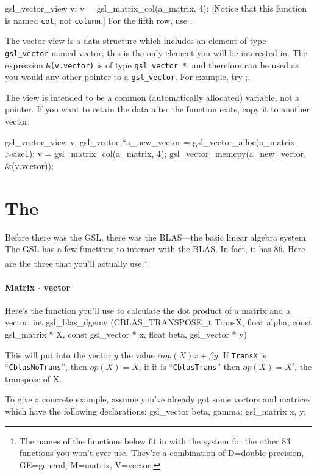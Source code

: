 gsl_vector_view v;
v = gsl_matrix_col(a_matrix, 4);
[Notice that this function is named {\tt col}, not {\tt column}.]
For the fifth row, use . 

The vector view is a data structure which includes an element of type {\tt gsl\_vector}
named vector; this is the only element you will be interested in. The
expression {\tt \&(v.vector)} is of type {\tt gsl\_vector *}, and therefore can
be used as you would any other pointer to a {\tt gsl\_vector}. For example,
try ;.

The view is intended to be a common (automatically allocated) variable,
not a pointer. If you want to retain the data after the function exits,
copy it to another vector:

gsl_vector_view v;
gsl_vector *a_new_vector = gsl_vector_alloc(a_matrix->size1);
v = gsl_matrix_col(a_matrix, 4);
gsl_vector_memcpy(a_new_vector, &(v.vector));

\section{The } 
Before there was the GSL, there was the BLAS---the basic linear algebra
system. The GSL has a few functions to interact with the BLAS. In fact,
it has 86. Here are the three that you'll actually use.\footnote{
The names of the functions below fit in with the system for the other 83
functions you won't ever use. They're a combination of D=double precision,
GE=general, M=matrix, V=vector.}

\paragraph{Matrix $\cdot$ vector} Here's the function you'll use to calculate the dot product of a
matrix and a vector:
int gsl_blas_dgemv (CBLAS_TRANSPOSE_t TransX, float alpha, 
          const gsl_matrix * X, const gsl_vector * x, 
          float beta, gsl_vector * y)

This will put into the vector $y$ the value $\alpha op(X) x + \beta y$. 
If {\tt TransX} is ``{\tt CblasNoTrans}'',  then $op(X)=X$; if it is
``{\tt CblasTrans}'' then $op(X)=X'$, the transpose of X.


To give a concrete example, assume you've already got some vectors and matrices which have the following
declarations:
gsl_vector beta, gamma;     
gsl_matrix x, y;           

